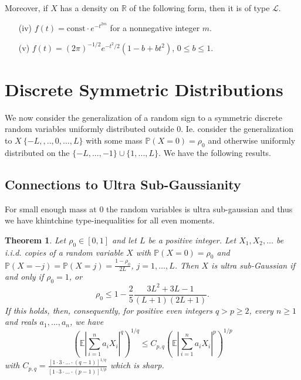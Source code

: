 \documentclass[10pt]{article}
\newcommand{\Pp}{\mathbb{P}}
\newcommand{\E}{\mathbb{E}}
\newcommand{\1}{\textbf{1}}
\newcommand{\R}{\mathbb{R}}
\newcommand{\p}[1]{\mathbb{P}\left( #1 \right)}
\newtheorem{theorem}{Theorem}
\theoremstyle{remark}
\theoremstyle{definition}
\begin{document}
\begin{enumerate}[(a)]
Moreover, if $X$ has a density on $\R$ of the following form, then it is of type $\mathcal{L}$.

\begin{enumerate}
\item[(iv)] $f(t) = \text{const}\cdot e^{-t^{2m}}$ for a nonnegative integer $m$.  

\item[(v)] $f(t) = (2\pi)^{-1/2}e^{-t^2/2}(1-b+ bt^2)$, $0 \leq b \leq 1$.
\end{enumerate}


\end{enumerate}

\newpage

\section{Discrete Symmetric Distributions}

We now consider the generalization of a random sign to a symmetric discrete random variables uniformly distributed outside 0. Ie. consider the generalization to $X ~ \{-L,,..,0,...,L\}$ with some mass $\Pp(X = 0) = \rho_0$ and otherwise uniformly distributed on the $\{-L,...,-1\} \cup \{1,...,L\}$. We have the following results.

\subsection{Connections to Ultra Sub-Gaussianity}

For small enough mass at 0 the random variables is ultra sub-gaussian and thus we have khintchine type-inequalities for all even moments.

\begin{theorem}\label{thm:USG}
Let $\rho_0 \in [0,1]$ and let $L$ be a positive integer. Let $X_1, X_2,\dots$ be i.i.d. copies of a random variable $X$ with $\p{X=0} = \rho_0$ and $\p{X = -j} = \p{X = j} = \frac{1-\rho_0}{2L}$, $j = 1,\dots,L$. Then $X$ is ultra sub-Gaussian if and only if $\rho_0 = 1$, or
\begin{equation}\label{eq:USG-rho}
\rho_0 \leq 1 - \frac{2}{5}\frac{3L^2+3L-1}{(L+1)(2L+1)}.
\end{equation}
If this holds, then, consequently, for positive even integers $q > p \geq 2$, every $n \geq 1$ and reals $a_1,\dots,a_n$, we have
\begin{equation}\label{eq:Khin-even}
\left(\E\left|\sum_{i=1}^n a_iX_i\right|^q\right)^{1/q} \leq C_{p,q}\left(\E\left|\sum_{i=1}^n a_iX_i\right|^p\right)^{1/p}
\end{equation}
with $C_{p,q} = \frac{[1\cdot 3\cdot\ldots \cdot (q-1)]^{1/q}}{[1\cdot 3\cdot\ldots \cdot (p-1)]^{1/p}}$ which is sharp.
\end{theorem}
\end{document}
